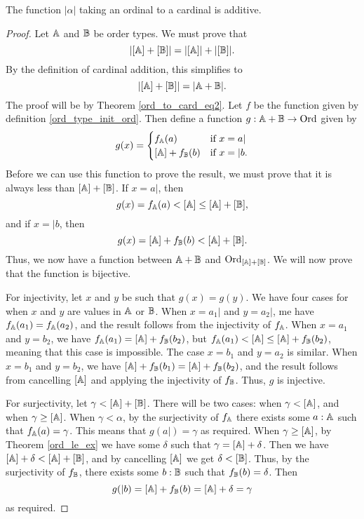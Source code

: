 \documentclass[../../math.tex]{subfiles}
\begin{document}
\begin{instance}
    The function $|\alpha|$ taking an ordinal to a cardinal is additive.
\end{instance}
\begin{proof}
    Let $\mathbb{A}$ and $\mathbb{B}$ be order types.  We must prove that
    \[
        |[\mathbb{A}] + [\mathbb{B}]| = |[\mathbb{A}]| + |[\mathbb{B}]|.
    \]
    By the definition of cardinal addition, this simplifies to
    \[
        |[\mathbb{A}] + [\mathbb{B}]| = |\mathbb{A} + \mathbb{B}|.
    \]
    The proof will be by Theorem \ref{ord_to_card_eq2}.  Let $f$ be the function
    given by definition \ref{ord_type_init_ord}.  Then define a function $g : \mathbb{A}
    + \mathbb{B} \to \operatorname{Ord}$ given by
    \[
        g(x) =
        \begin{cases}
            f_\A(a) &\text{if $x = a|$} \\
            [\A] + f_\B(b) &\text{if $x = |b$.}
        \end{cases}
    \]
    Before we can use this function to prove the result, we must prove that it
    is always less than $[\mathbb{A}] + [\mathbb{B}]$.  If $x = a|$, then
    \[
        g(x) = f_{\mathbb{A}}(a) < [\mathbb{A}] \leq [\mathbb{A}] + [\mathbb{B}],
    \]
    and if $x = |b$, then
    \[
        g(x) = [\mathbb{A}] + f_{\mathbb{B}}(b) < [\mathbb{A}] + [\mathbb{B}].
    \]
    Thus, we now have a function between $\mathbb{A} + \mathbb{B}$ and $\operatorname{Ord}_{[\mathbb{A}] + [\mathbb{B}]}$.  We
    will now prove that the function is bijective.

    For injectivity, let $x$ and $y$ be such that $g(x) = g(y)$.  We have four
    cases for when $x$ and $y$ are values in $\mathbb{A}$ or $\mathbb{B}$.  When $x = a_1|$ and
    $y = a_2|$, me have $f_{\mathbb{A}}(a_1) = f_{\mathbb{A}}(a_2)$, and the result follows from the
    injectivity of $f_{\mathbb{A}}$.  When $x = a_1$ and $y = b_2$, we have $f_{\mathbb{A}}(a_1) =
    [\mathbb{A}] + f_{\mathbb{B}}(b_2)$, but $f_{\mathbb{A}}(a_1) < [\mathbb{A}] \leq [\mathbb{A}] + f_{\mathbb{B}}(b_2)$, meaning
    that this case is impossible.  The case $x = b_1$ and $y = a_2$ is similar.
    When $x = b_1$ and $y = b_2$, we have $[\mathbb{A}] + f_{\mathbb{B}}(b_1) = [\mathbb{A}] + f_{\mathbb{B}}(b_2)$,
    and the result follows from cancelling $[\mathbb{A}]$ and applying the injectivity
    of $f_{\mathbb{B}}$.  Thus, $g$ is injective.

    For surjectivity, let $\gamma < [\mathbb{A}] + [\mathbb{B}]$.  There will be two cases:
    when $\gamma < [\mathbb{A}]$, and when $\gamma \geq [\mathbb{A}]$.  When $\gamma < \alpha$,
    by the surjectivity of $f_{\mathbb{A}}$ there exists some $a : \mathbb{A}$ such that
    $f_{\mathbb{A}}(a) = \gamma$.  This means that $g(a|) = \gamma$ as required.  When
    $\gamma \geq [\mathbb{A}]$, by Theorem \ref{ord_le_ex} we have some $\delta$ such
    that $\gamma = [\mathbb{A}] + \delta$.  Then we have $[\mathbb{A}] + \delta < [\mathbb{A}] + [\mathbb{B}]$,
    and by cancelling $[\mathbb{A}]$ we get $\delta < [\mathbb{B}]$.  Thus, by the surjectivity
    of $f_{\mathbb{B}}$, there exists some $b : \mathbb{B}$ such that $f_{\mathbb{B}}(b) = \delta$.  Then
    \[
        g(|b) = [\mathbb{A}] + f_{\mathbb{B}}(b) = [\mathbb{A}] + \delta = \gamma
    \]
    as required.
\end{proof}
\end{document}

